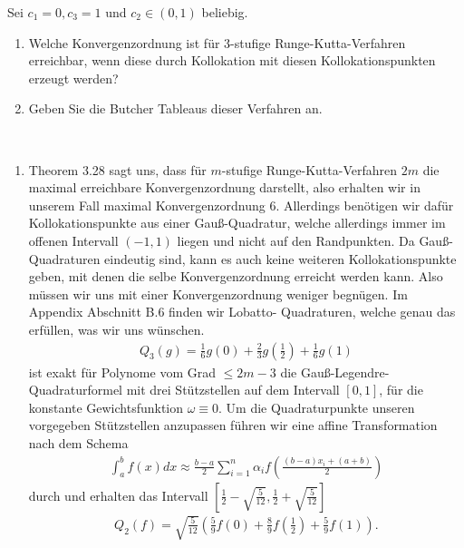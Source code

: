 \begin{exercise}
Sei $c_1 = 0, c_3 = 1$ und $c_2 \in (0,1)$ beliebig.
\begin{enumerate}[label = \textbf{\alph*)}]
  \item Welche Konvergenzordnung ist für 3-stufige Runge-Kutta-Verfahren erreichbar,
  wenn diese durch Kollokation mit diesen Kollokationspunkten erzeugt werden?
  \item Geben Sie die Butcher Tableaus dieser Verfahren an.
\end{enumerate}
\end{exercise}
\begin{solution}
\leavevmode \\
\begin{enumerate}[label = \textbf{\alph*)}]
  \item Theorem 3.28 sagt uns, dass für $m$-stufige Runge-Kutta-Verfahren $2m$ die maximal
  erreichbare Konvergenzordnung darstellt, also erhalten wir in unserem Fall maximal Konvergenzordnung 6. Allerdings benötigen wir dafür
  Kollokationspunkte aus einer Gauß-Quadratur, welche allerdings immer
  im offenen Intervall $(-1,1)$ liegen und nicht auf den Randpunkten.
  Da Gauß-Quadraturen eindeutig sind, kann es auch keine weiteren
  Kollokationspunkte geben, mit denen die selbe Konvergenzordnung
  erreicht werden kann. Also müssen wir uns mit einer Konvergenzordnung
  weniger begnügen. Im Appendix Abschnitt B.6 finden wir Lobatto-
  Quadraturen, welche genau das erfüllen, was wir uns wünschen.
  \begin{align*}
    Q_3(g) = \frac{1}{6}g(0) + \frac{2}{3}g\left(\frac{1}{2}\right)
    + \frac{1}{6}g(1)
  \end{align*}
  ist exakt für Polynome vom Grad $\leq 2m-3$
  die Gauß-Legendre-Quadraturformel mit drei Stützstellen auf dem Intervall $[0,1]$,
  für die konstante Gewichtsfunktion $\omega \equiv 0$. Um die Quadraturpunkte unseren
  vorgegeben Stützstellen anzupassen führen wir eine affine Transformation nach dem Schema
  \begin{align*}
    \int_a^b f(x)dx \approx \frac{b-a}{2}\sum_{i = 1}^n\alpha_i f\left(\frac{(b-a)x_i + (a+b)}{2}\right)
  \end{align*}
  durch und erhalten das Intervall $\left[\frac{1}{2} - \sqrt{\frac{5}{12}}, \frac{1}{2} + \sqrt{\frac{5}{12}}\right]$
  \begin{align*}
  Q_2(f) = \sqrt{\frac{5}{12}}\left(\frac{5}{9}f(0) + \frac{8}{9}f\left(\frac{1}{2}\right)
  + \frac{5}{9}f(1)\right).
  \end{align*}

\end{enumerate}
\end{solution}
